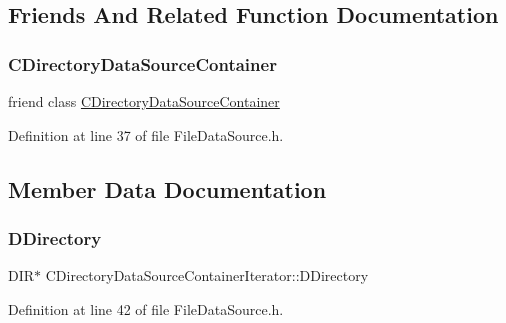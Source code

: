 \subsection{Friends And Related Function Documentation}
\hypertarget{classCDirectoryDataSourceContainerIterator_ab421e385625629f6c45d70648a928574}{}\label{classCDirectoryDataSourceContainerIterator_ab421e385625629f6c45d70648a928574} 
\subsubsection{\texorpdfstring{C\+Directory\+Data\+Source\+Container}{CDirectoryDataSourceContainer}}
{\footnotesize\ttfamily friend class \hyperlink{classCDirectoryDataSourceContainer}{C\+Directory\+Data\+Source\+Container}\hspace{0.3cm}{\ttfamily [friend]}}



Definition at line 37 of file File\+Data\+Source.\+h.



\subsection{Member Data Documentation}
\hypertarget{classCDirectoryDataSourceContainerIterator_a0e07044b1a916e3dd931ae0778317e16}{}\label{classCDirectoryDataSourceContainerIterator_a0e07044b1a916e3dd931ae0778317e16} 
\subsubsection{\texorpdfstring{D\+Directory}{DDirectory}}
{\footnotesize\ttfamily D\+IR$\ast$ C\+Directory\+Data\+Source\+Container\+Iterator\+::\+D\+Directory\hspace{0.3cm}{\ttfamily [protected]}}



Definition at line 42 of file File\+Data\+Source.\+h.

